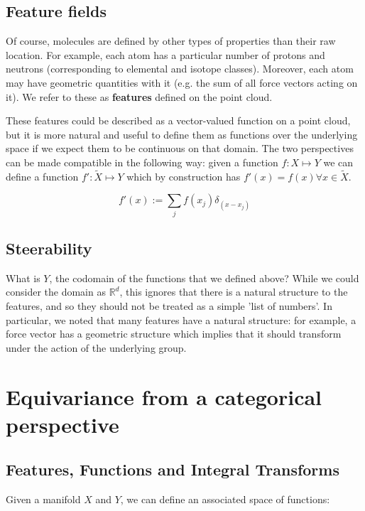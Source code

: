 \documentclass[11pt]{article}
\begin{document}
\subsection{Feature fields}
Of course, molecules are defined by other types of properties than their raw location. For example, each atom has a particular number of protons and neutrons (corresponding to elemental and isotope classes). Moreover, each atom may have geometric quantities with it (e.g. the sum of all force vectors acting on it). We refer to these as \textbf{features} defined on the point cloud.

These features could be described as a vector-valued function on a point cloud, but it is more natural and useful to define them as functions over the underlying space if we expect them to be continuous on that domain. The two perspectives can be made compatible in the following way: given a function $f: X \mapsto Y$ we can define a function $f': \tilde{X} \mapsto Y$ which by construction has $f'(x) = f(x) \forall x \in \tilde{X}$.

$$ f'(x) := \sum_j f(x_j)\delta_(x - x_j)$$



\subsection*{Steerability}

What is $Y$, the codomain of the functions that we defined above? While we could consider the domain as $\mathbb{R}^d$, this ignores that there is a natural structure to the features, and so they should not be treated as a simple 'list of numbers'. In particular, we noted that many features have a natural structure: for example, a force vector has a geometric structure which implies that it should transform under the action of the underlying group. 



\section{Equivariance from a categorical perspective}

\subsection*{Features, Functions and Integral Transforms}

Given a manifold $X$ and $Y$, we can define an associated space of functions:
\end{document}
